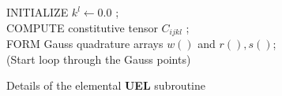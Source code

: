 \newpage
\begin{algorithm}[H]
\SetAlgoLined
{}
\BlankLine
INITIALIZE $k^l \leftarrow 0.0$ ;\\
COMPUTE constitutive tensor $C_{ijkl}$ ;\\
FORM Gauss quadrature arrays $w()$ and $r() , s()$;\\
(Start loop through the Gauss points)
\BlankLine
{}
\BlankLine
\caption{Details of the elemental {\bf UEL} subroutine}
\label{algo:uel}
\end{algorithm}


%
%



